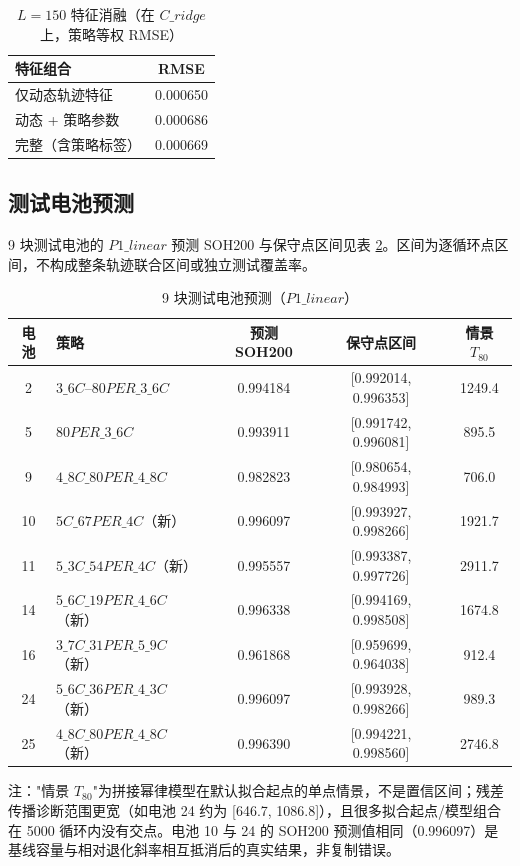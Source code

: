 \documentclass[withoutpreface,bwprint]{cumcmthesis}
\begin{document}
\begin{table}[H]\centering
\caption{$L=150$ 特征消融（在 $C\_ridge$ 上，策略等权 RMSE）}\label{tab:q3ab}
\begin{tabular}{lc}
\toprule
特征组合 & RMSE\\
\midrule
仅动态轨迹特征 & 0.000650\\
动态 + 策略参数 & 0.000686\\
完整（含策略标签） & 0.000669\\
\bottomrule
\end{tabular}
\end{table}

\subsection{测试电池预测}
9 块测试电池的 $P1\_linear$ 预测 SOH200 与保守点区间见表 \ref{tab:q3}。区间为逐循环点区间，不构成整条轨迹联合区间或独立测试覆盖率。

\begin{table}[H]\centering
\caption{9 块测试电池预测（$P1\_linear$）}\label{tab:q3}
\begin{tabular}{clccc}
\toprule
电池 & 策略 & 预测 SOH200 & 保守点区间 & 情景 $T_{80}$\\
\midrule
2 & $3\_6C$--$80PER\_3\_6C$ & 0.994184 & [0.992014, 0.996353] & 1249.4\\
5 & $80PER\_3\_6C$ & 0.993911 & [0.991742, 0.996081] & 895.5\\
9 & $4\_8C\_80PER\_4\_8C$ & 0.982823 & [0.980654, 0.984993] & 706.0\\
10 & $5C\_67PER\_4C$（新） & 0.996097 & [0.993927, 0.998266] & 1921.7\\
11 & $5\_3C\_54PER\_4C$（新） & 0.995557 & [0.993387, 0.997726] & 2911.7\\
14 & $5\_6C\_19PER\_4\_6C$（新） & 0.996338 & [0.994169, 0.998508] & 1674.8\\
16 & $3\_7C\_31PER\_5\_9C$（新） & 0.961868 & [0.959699, 0.964038] & 912.4\\
24 & $5\_6C\_36PER\_4\_3C$（新） & 0.996097 & [0.993928, 0.998266] & 989.3\\
25 & $4\_8C\_80PER\_4\_8C$（新） & 0.996390 & [0.994221, 0.998560] & 2746.8\\
\bottomrule
\end{tabular}
\par\footnotesize 注："情景 $T_{80}$"为拼接幂律模型在默认拟合起点的单点情景，不是置信区间；残差传播诊断范围更宽（如电池 24 约为 [646.7, 1086.8]），且很多拟合起点/模型组合在 5000 循环内没有交点。电池 10 与 24 的 SOH200 预测值相同（0.996097）是基线容量与相对退化斜率相互抵消后的真实结果，非复制错误。
\end{table}
\end{document}
